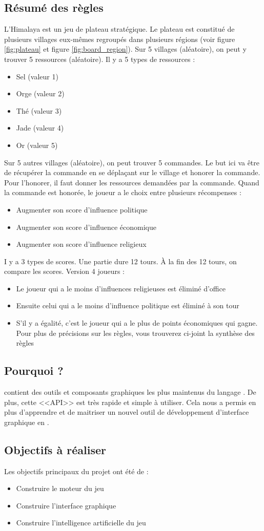 \subsection{Résumé des règles}
L’Himalaya est un jeu de plateau stratégique. Le plateau est constitué de plusieurs villages eux-mêmes regroupés dans plusieurs régions (voir figure \ref{fig:plateau} et figure \ref{fig:board_region}). Sur 5 villages (aléatoire), on peut y trouver 5 ressources (aléatoire). Il y a 5 types de ressources : 
\begin{itemize}
	\item Sel (valeur 1)
	\item Orge (valeur 2)
	\item Thé (valeur 3)
	\item Jade (valeur 4)
	\item Or (valeur 5)
\end{itemize}
Sur 5 autres villages (aléatoire), on peut trouver 5 commandes. Le but ici va être de récupérer la commande en se déplaçant sur le village et honorer la commande. Pour l’honorer, il faut donner les ressources demandées par la commande. Quand la commande est honorée, le joueur a le choix entre plusieurs récompenses : 
\begin{itemize}
	\item Augmenter son score d’influence politique
	\item Augmenter son score d’influence économique
	\item Augmenter son score d’influence religieux 
\end{itemize}
I y a 3 types de scores. Une partie dure 12 tours. À la fin des 12 tours, on compare les scores. Version 4 joueurs : 
\begin{itemize}
	\item Le joueur qui a le moins d’influences religieuses est éliminé d’office
	\item Ensuite celui qui a le moins d’influence politique est éliminé à son tour
	\item S’il y a égalité, c’est le joueur qui a le plus de points économiques qui gagne. 
	Pour plus de précisions sur les règles, vous trouverez ci-joint la synthèse des règles 
\end{itemize}

\subsection{Pourquoi \fx ?}
\fx contient des outils et composants graphiques les plus maintenus du langage \java.
De plus, cette <<API>> est très rapide et simple à utiliser.
Cela nous a permis en plus d’apprendre et de maitriser un nouvel outil de développement d’interface graphique en \java.

\subsection{Objectifs à réaliser}
Les objectifs principaux du projet ont été de :
\begin{itemize} 
	\item Construire le moteur du jeu
	\item Construire l'interface graphique
	\item Construire l’intelligence artificielle du jeu
\end{itemize}

